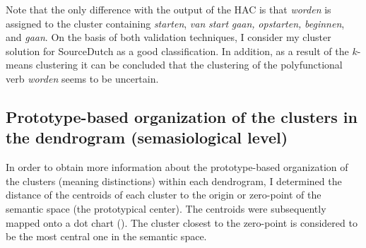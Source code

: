 Note that the only difference with the output of the HAC is that \textit{worden} is assigned to the cluster containing \textit{starten}, \textit{van} \textit{start} \textit{gaan,} \textit{opstarten,} \textit{beginnen}, and \textit{gaan}. On the basis of both validation techniques, I consider my cluster solution for SourceDutch as a good classification. In addition, as a result of the $k$-means clustering it can be concluded that the clustering of the polyfunctional verb \textit{worden} seems to be uncertain.

\subsection{Prototype-based organization of the clusters in the dendrogram (semasiological level)}
\label{sec:4.2.2}  
In order to obtain more information about the prototype-based organization of the clusters (meaning distinctions) within each dendrogram, I determined the distance of the centroids of each cluster to the origin or zero-point of the semantic space (the prototypical center). The centroids were subsequently mapped onto a dot chart (). The cluster closest to the zero-point is considered to be the most central one in the semantic space.

